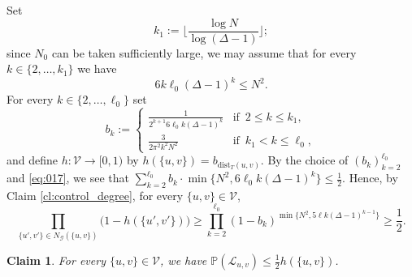 \documentclass[11pt,leqno]{amsart}
\newtheorem{claim}[theorem]{Claim}
\theoremstyle{remark}
\theoremstyle{plain}
\begin{document}
Set
\[ k_1 := \Big\lfloor \frac{\log N }{\log(\Delta-1)} \Big\rfloor; \]
since $N_0$ can be taken sufficiently large, we may assume that for every $k\in\{2,\dots, k_1\}$ we have
\begin{equation}\label{eq:017}
6k\ell_0(\Delta-1)^k\leqslant N^2.
\end{equation}
For every $k\in \{2,\dots,\ell_0\}$ set
\[ b_k:=
\begin{cases}
\frac{1}{2^{k+1}6\ell_0 k (\Delta-1)^k}
 & \text{if } \, 2\leqslant k\leqslant k_1, \\
\frac{3}{2\pi^2 k^2 N^2}
& \text{if } \, k_1<k \leqslant \ell_0,
\end{cases} \]
and define $h\colon \mathcal{V}\to[0,1)$ by $h(\{u,v\}) = b_{\mathrm{dist}_T(u,v)}$.
By the choice of $(b_k)_{k=2}^{\ell_0}$ and \eqref{eq:017}, we see that
$\sum_{k=2}^{\ell_0} b_k\cdot\min\{N^2, 6\ell_0 k (\Delta-1)^k \}\leqslant \frac{1}{2}$.
Hence, by Claim \ref{cl:control_degree}, for every $\{u,v\}\in \mathcal{V}$,
\begin{equation}\label{eq:018}
\prod_{\{u',v'\}\in N_{\mathcal{G}}(\{u,v\})} \big(1-h(\{u',v'\})\big)\geqslant
\prod_{k=2}^{\ell_0} (1-b_k)^{\min\{N^2, 5\ell k (\Delta-1)^{k-1}\}} \geqslant \frac{1}{2}.
\end{equation}
\begin{claim}\label{claim_Lovatz_condition}
For every $\{u,v\}\in\mathcal{V}$, we have $\mathbb{P}(\mathcal{L}_{u,v})\leqslant\frac{1}{2}h(\{u,v\})$.
\end{claim}
\end{document}
